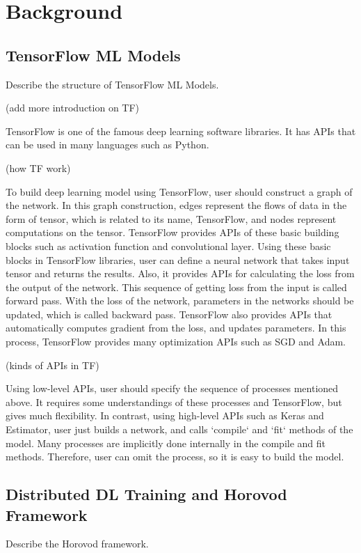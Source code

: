 \section{Background}\label{sec:background}
\subsection{TensorFlow ML Models}
Describe the structure of TensorFlow ML Models.

(add more introduction on TF)

TensorFlow is one of the famous deep learning software libraries.
It has APIs that can be used in many languages such as Python.

(how TF work)

To build deep learning model using TensorFlow,
user should construct a graph of the network.
In this graph construction, edges represent the flows of data in the form of tensor,
which is related to its name, TensorFlow,
and nodes represent computations on the tensor.
TensorFlow provides APIs of these basic building blocks
such as activation function and convolutional layer.
Using these basic blocks in TensorFlow libraries, user can define a neural network
that takes input tensor and returns the results.
Also, it provides APIs for calculating the loss from the output of the network.
This sequence of getting loss from the input is called forward pass.
With the loss of the network, parameters in the networks should be updated,
which is called backward pass.
TensorFlow also provides APIs that automatically computes gradient from the loss,
and updates parameters.
In this process, TensorFlow provides many optimization APIs
such as SGD and Adam.

(kinds of APIs in TF)

Using low-level APIs, user should specify the sequence of processes mentioned above.
It requires some understandings of these processes and TensorFlow,
but gives much flexibility.
In contrast, using high-level APIs such as Keras and Estimator,
user just builds a network, and calls `compile` and `fit` methods of the model.
Many processes are implicitly done internally in the compile and fit methods.
Therefore, user can omit the process, so it is easy to build the model.


\subsection{Distributed DL Training and Horovod Framework}
Describe the Horovod framework.

